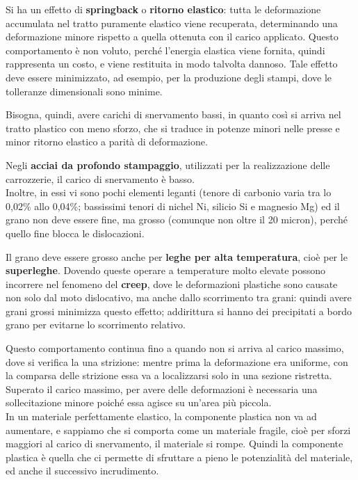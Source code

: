 Si ha un effetto di \textbf{springback} o \textbf{ritorno elastico}: tutta le deformazione accumulata nel tratto puramente elastico viene recuperata, determinando una deformazione minore rispetto a quella ottenuta con il carico applicato. Questo comportamento è non voluto, perché l’energia elastica viene fornita, quindi rappresenta un costo, e viene restituita in modo talvolta dannoso. Tale effetto deve essere minimizzato, ad esempio, per la produzione degli stampi, dove le tolleranze dimensionali sono minime.

Bisogna, quindi, avere carichi di snervamento bassi, in quanto così si arriva nel tratto plastico con meno sforzo, che si traduce in potenze minori nelle presse e minor ritorno elastico a parità di deformazione.

Negli \textbf{acciai da profondo stampaggio}, utilizzati per la realizzazione delle carrozzerie, il carico di snervamento è basso.\\
Inoltre, in essi vi sono pochi elementi leganti (tenore di carbonio varia tra lo 0,02\% allo 0,04\%; bassissimi tenori di nichel Ni, silicio Si e magnesio Mg) ed il grano non deve essere fine, ma grosso (comunque non oltre il 20 micron), perché quello fine blocca le dislocazioni.

Il grano deve essere grosso anche per \textbf{leghe per alta temperatura}, cioè per le \textbf{superleghe}. Dovendo queste operare a temperature molto elevate possono incorrere nel fenomeno del \textbf{creep}, dove le deformazioni plastiche sono causate non solo dal moto dislocativo, ma anche dallo scorrimento tra grani: quindi avere grani grossi minimizza questo effetto; addirittura si hanno dei precipitati a bordo grano per evitarne lo scorrimento relativo.

Questo comportamento continua fino a quando non si arriva al carico massimo, dove si verifica la una strizione: mentre prima la deformazione era uniforme, con la comparsa delle strizione essa va a localizzarsi solo in una sezione ristretta.\\
Superato il carico massimo, per avere delle deformazioni è necessaria una sollecitazione minore poiché essa agisce su un’area più piccola.\\
In un materiale perfettamente elastico, la componente plastica non va ad aumentare, e sappiamo che si comporta come un materiale fragile, cioè per sforzi maggiori al carico di snervamento, il materiale si rompe.
Quindi la componente plastica è quella che ci permette di sfruttare a pieno le potenzialità del materiale, ed anche il successivo incrudimento.

